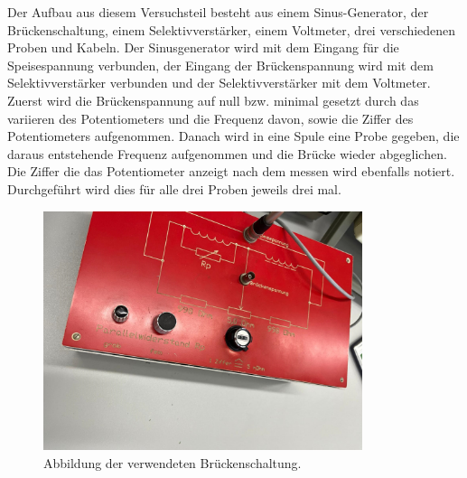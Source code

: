 \begin{flushleft}
    Der Aufbau aus diesem Versuchsteil besteht aus einem Sinus-Generator, der Brückenschaltung, einem Selektivverstärker, einem Voltmeter, drei verschiedenen Proben und Kabeln.
    Der Sinusgenerator wird mit dem Eingang für die Speisespannung verbunden, der Eingang der Brückenspannung wird mit dem Selektivverstärker verbunden und der Selektivverstärker mit dem Voltmeter.
    Zuerst wird die Brückenspannung auf null bzw. minimal gesetzt durch das variieren des Potentiometers und die Frequenz davon, sowie die Ziffer des Potentiometers aufgenommen.
    Danach wird in eine Spule eine Probe gegeben, die daraus entstehende Frequenz aufgenommen und die Brücke wieder abgeglichen. 
    Die Ziffer die das Potentiometer anzeigt nach dem messen wird ebenfalls notiert. 
    Durchgeführt wird dies für alle drei Proben jeweils drei mal.
\end{flushleft}

\begin{figure}[H]
    \centering
    \includegraphics[height=70mm]{bilder/Ab5.jpeg}
    \caption{Abbildung der verwendeten Brückenschaltung.\label{Abbildung5} }
\end{figure}

